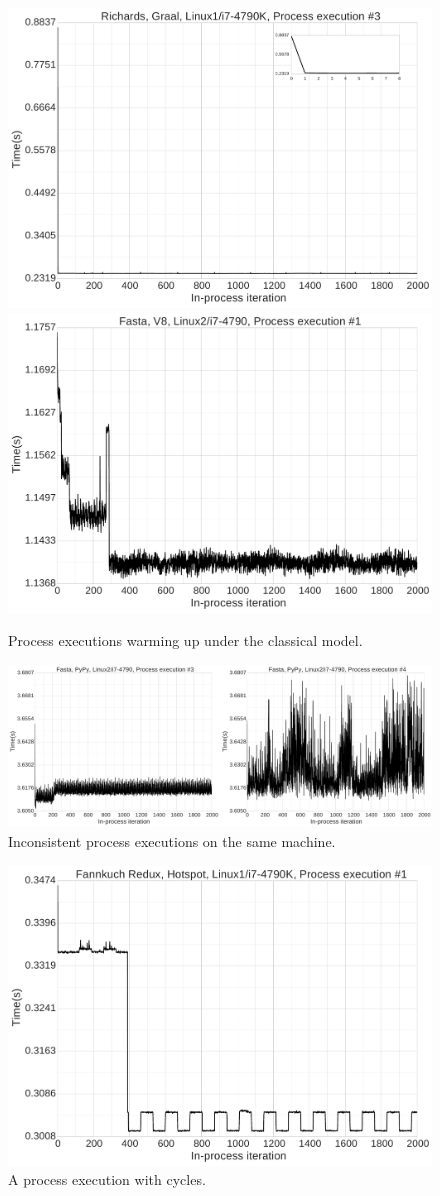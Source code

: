 \documentclass[preprint]{sigplanconf}
\begin{document}
\begin{figure}
\includegraphics[width=.5\textwidth]{examples_v2_results/good_fast.pdf}
\includegraphics[width=.5\textwidth]{examples_v2_results/good_tiers.pdf}
\caption{Process executions warming up under the classical model.}
\label{fig:good1}
\end{figure}

\begin{figure}
\includegraphics[width=\textwidth]{examples_v2_results/bad_inconsistent.pdf}
\caption{Inconsistent process executions on the same machine.}
\label{fig:inconsistent}
\end{figure}



\begin{figure}
\includegraphics[width=.5\textwidth]{examples_v2_results/bad_cycles.pdf}
\caption{A process execution with cycles.}
\label{fig:cycles}
\end{figure}
\end{document}
